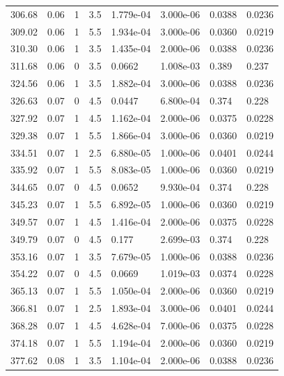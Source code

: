 \documentclass[preview]{standalone}
\begin{document}
{{{\begin{tabular}{L{1.2cm}C{1.2cm} C{0.3cm}C{0.5cm} C{1.4cm}C{1.4cm} C{1.4cm}C{1.4cm}}
  306.68  &  0.06  & 1     & 3.5 &  1.779e-04  & 3.000e-06  & 0.0388 &  0.0236   \\ 
  309.02  &  0.06  & 1     & 5.5 &  1.934e-04  & 3.000e-06  & 0.0360 &  0.0219   \\ 
  310.30  &  0.06  & 1     & 3.5 &  1.435e-04  & 2.000e-06  & 0.0388 &  0.0236   \\ 
  311.68  &  0.06  & 0     & 3.5 &  0.0662  & 1.008e-03  & 0.389 &  0.237   \\ 
  324.56  &  0.06  & 1     & 3.5 &  1.882e-04  & 3.000e-06  & 0.0388 &  0.0236   \\ 
  326.63  &  0.07  & 0     & 4.5 &  0.0447  & 6.800e-04  & 0.374 &  0.228   \\ 
  327.92  &  0.07  & 1     & 4.5 &  1.162e-04  & 2.000e-06  & 0.0375 &  0.0228   \\ 
  329.38  &  0.07  & 1     & 5.5 &  1.866e-04  & 3.000e-06  & 0.0360 &  0.0219   \\ 
  334.51  &  0.07  & 1     & 2.5 &  6.880e-05  & 1.000e-06  & 0.0401 &  0.0244   \\ 
  335.92  &  0.07  & 1     & 5.5 &  8.083e-05  & 1.000e-06  & 0.0360 &  0.0219   \\ 
  344.65  &  0.07  & 0     & 4.5 &  0.0652  & 9.930e-04  & 0.374 &  0.228   \\ 
  345.23  &  0.07  & 1     & 5.5 &  6.892e-05  & 1.000e-06  & 0.0360 &  0.0219   \\ 
  349.57  &  0.07  & 1     & 4.5 &  1.416e-04  & 2.000e-06  & 0.0375 &  0.0228   \\ 
  349.79  &  0.07  & 0     & 4.5 &  0.177  & 2.699e-03  & 0.374 &  0.228   \\ 
  353.16  &  0.07  & 1     & 3.5 &  7.679e-05  & 1.000e-06  & 0.0388 &  0.0236   \\ 
  354.22  &  0.07  & 0     & 4.5 &  0.0669  & 1.019e-03  & 0.0374 &  0.0228   \\ 
  365.13  &  0.07  & 1     & 5.5 &  1.050e-04  & 2.000e-06  & 0.0360 &  0.0219   \\ 
  366.81  &  0.07  & 1     & 2.5 &  1.893e-04  & 3.000e-06  & 0.0401 &  0.0244   \\ 
  368.28  &  0.07  & 1     & 4.5 &  4.628e-04  & 7.000e-06  & 0.0375 &  0.0228   \\ 
  374.18  &  0.07  & 1     & 5.5 &  1.194e-04  & 2.000e-06  & 0.0360 &  0.0219   \\ 
  377.62  &  0.08  & 1     & 3.5 &  1.104e-04  & 2.000e-06  & 0.0388 &  0.0236   \\ 

\end{tabular}}}}
\end{document}
